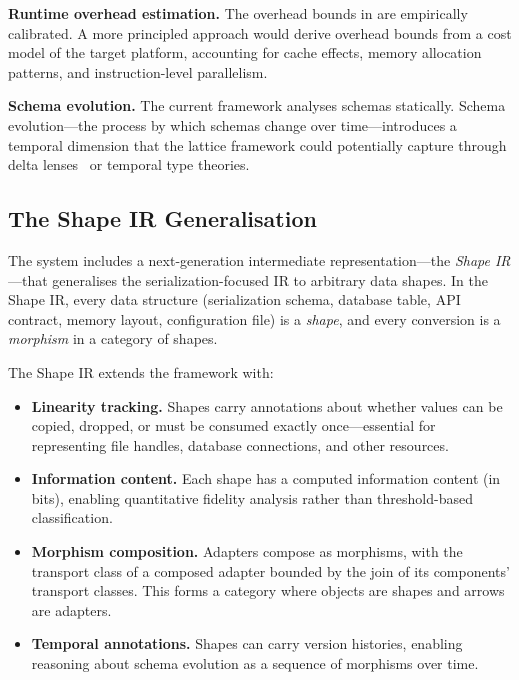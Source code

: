 \documentclass[11pt,a4paper]{article}
\theoremstyle{definition}
\theoremstyle{remark}
\begin{document}
\textbf{Runtime overhead estimation.} The overhead bounds in
 are empirically calibrated. A more principled
approach would derive overhead bounds from a cost model of the target
platform, accounting for cache effects, memory allocation patterns,
and instruction-level parallelism.

\textbf{Schema evolution.} The current framework analyses schemas
statically. Schema evolution---the process by which schemas change
over time---introduces a temporal dimension that the lattice framework
could potentially capture through delta lenses~\cite{diskin2011delta}
or temporal type theories.

\subsection{The Shape IR Generalisation}

The system includes a next-generation intermediate
representation---the \emph{Shape IR}---that generalises the
serialization-focused IR to arbitrary data shapes. In the Shape IR,
every data structure (serialization schema, database table, API
contract, memory layout, configuration file) is a \emph{shape}, and
every conversion is a \emph{morphism} in a category of shapes.

The Shape IR extends the framework with:
\begin{itemize}[leftmargin=*]
  \item \textbf{Linearity tracking.} Shapes carry annotations about
    whether values can be copied, dropped, or must be consumed
    exactly once---essential for representing file handles, database
    connections, and other resources.

  \item \textbf{Information content.} Each shape has a computed
    information content (in bits), enabling quantitative fidelity
    analysis rather than threshold-based classification.

  \item \textbf{Morphism composition.} Adapters compose as morphisms,
    with the transport class of a composed adapter bounded by the
    join of its components' transport classes. This forms a category
    where objects are shapes and arrows are adapters.

  \item \textbf{Temporal annotations.} Shapes can carry version
    histories, enabling reasoning about schema evolution as a
    sequence of morphisms over time.
\end{itemize}
\end{document}
